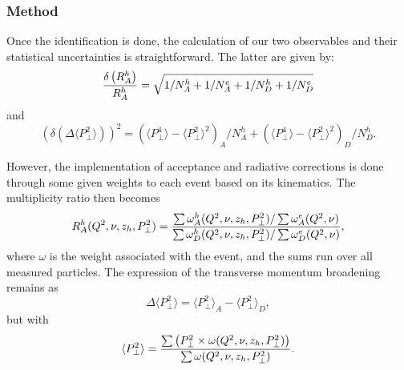 \subsubsection{Method}
\label{RatioCalc}

Once the identification is done, the calculation of our two observables and their statistical uncertainties is straightforward. The latter are given by:
\begin{equation}
{\delta \left ( R_A^h \right ) \over R_A^h} = \sqrt{ 1 /N_A^h + 1/ N_A^e +1/N_D^h + 1/N_D^e}
\end{equation}
and
\begin{equation}
\left ( \delta \left ( \Delta \langle P_\perp^2 \rangle \right ) \right )^2 = 
   \left ({\langle P_\perp^4 \rangle - \langle P_\perp^2 \rangle ^2}\right )_A / N_A^h
 + \left ({\langle P_\perp^4 \rangle - \langle P_\perp^2 \rangle ^2}\right )_D / N_D^h.
\end{equation}

However, the implementation of acceptance and radiative corrections is done through some given weights to each event based on its kinematics. The multiplicity ratio then becomes
\begin{equation}
R_A^h (Q^2,\nu,z_h,P_\perp^2) = {{\sum \omega_A^h (Q^2,\nu,z_h,P_\perp^2) / \sum \omega_A^e (Q^2,\nu)} 
                       \over {\sum \omega_D^h (Q^2,\nu,z_h,P_\perp^2) / \sum \omega_D^e (Q^2,\nu)}},
\end{equation}
where $\omega$ is the weight associated with the event, and the sums run over all measured particles. The expression of the transverse momentum broadening remains as
\begin{equation}
\Delta \langle P_\perp^2 \rangle = \langle P_\perp^2 \rangle_A - \langle P_\perp^2 \rangle_D,
\end{equation}
but with
\begin{equation}
\langle P_\perp^2 \rangle = {\sum \left ( P_\perp^2 \times \omega (Q^2,\nu,z_h,P_\perp^2) \right ) \over \sum \omega (Q^2,\nu,z_h,P_\perp^2)}.
\end{equation}

